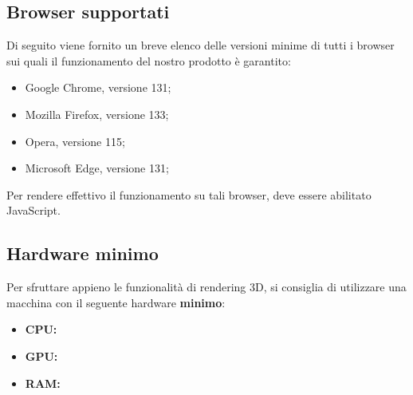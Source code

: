 \subsection{Browser supportati}
Di seguito viene fornito un breve elenco delle versioni minime di tutti i browser sui quali il funzionamento
del nostro prodotto è garantito:
\begin{itemize}
    \item Google Chrome, versione 131;
    \item Mozilla Firefox, versione 133;
    \item Opera, versione 115;
    \item Microsoft Edge, versione 131;
\end{itemize}

Per rendere effettivo il funzionamento su tali browser, deve essere abilitato JavaScript.

\subsection{Hardware minimo}
Per sfruttare appieno le funzionalità di rendering 3D, si consiglia di utilizzare una macchina con il seguente hardware \textbf{minimo}:
\begin{itemize}
    \item \textbf{CPU:}
    \item \textbf{GPU:}
    \item \textbf{RAM:}
\end{itemize}
